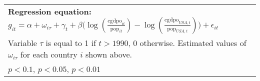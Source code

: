 \begin{table}[htbp]
\begin{tabular}{l*{3}{c}}
\bottomrule
\multicolumn{4}{l}{\footnotesize \textbf{Regression equation:} \(g_{it} = \alpha + \omega_{i\tau} + \gamma_t + \beta \big(\log (\frac{\textrm{cgdpo}_{it}}{\textrm{pop}_{it}} ) - \log (\frac{\textrm{cgdpo}_{USA,t}}{\textrm{pop}_{USA,t}}  ) \big) + \epsilon_{it}\)}\\
\multicolumn{4}{l}{\footnotesize Variable \(\tau\) is equal to 1 if \(t > 1990\), 0 otherwise. Estimated values of \(\omega_{i\tau}\) for each country \(i\) shown above.}\\
\multicolumn{4}{l}{\footnotesize \sym{*} \(p<0.1\), \sym{**} \(p<0.05\), \sym{***} \(p<0.01\)}\\
\end{tabular}
\end{table}
